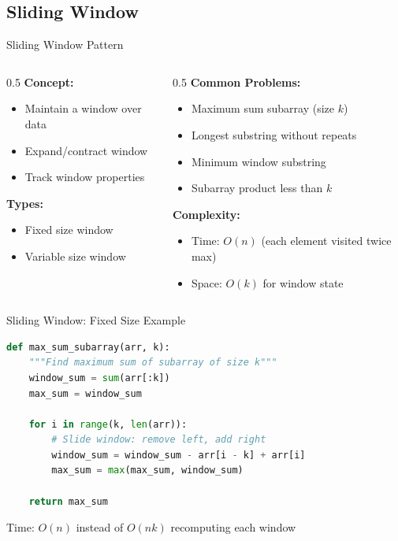 \documentclass[aspectratio=169,xcolor=dvipsnames]{beamer}
\begin{document}
\subsection{Sliding Window}

\begin{frame}{Sliding Window Pattern}
  \begin{columns}
    \begin{column}{0.5\textwidth}
      \textbf{Concept:}
      \begin{itemize}
        \item Maintain a window over data
        \item Expand/contract window
        \item Track window properties
      \end{itemize}

      \vspace{0.3cm}
      \textbf{Types:}
      \begin{itemize}
        \item Fixed size window
        \item Variable size window
      \end{itemize}
    \end{column}

    \begin{column}{0.5\textwidth}
      \textbf{Common Problems:}
      \begin{itemize}
        \item Maximum sum subarray (size $k$)
        \item Longest substring without repeats
        \item Minimum window substring
        \item Subarray product less than $k$
      \end{itemize}

      \vspace{0.3cm}
      \textbf{Complexity:}
      \begin{itemize}
        \item Time: $O(n)$ (each element visited twice max)
        \item Space: $O(k)$ for window state
      \end{itemize}
    \end{column}
  \end{columns}
\end{frame}

\begin{frame}[fragile]{Sliding Window: Fixed Size Example}
\begin{lstlisting}[language=Python]
def max_sum_subarray(arr, k):
    """Find maximum sum of subarray of size k"""
    window_sum = sum(arr[:k])
    max_sum = window_sum

    for i in range(k, len(arr)):
        # Slide window: remove left, add right
        window_sum = window_sum - arr[i - k] + arr[i]
        max_sum = max(max_sum, window_sum)

    return max_sum
\end{lstlisting}

Time: $O(n)$ instead of $O(nk)$ recomputing each window
\end{frame}
\end{document}
